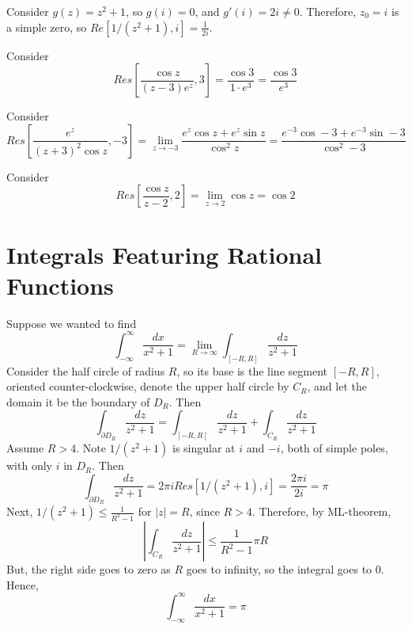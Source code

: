 \documentclass[12pt, a4paper, oneside, openright, titlepage]{book}
\begin{document}
\begin{eg}
    Consider $g(z) = z^2+1$, so $g(i) = 0$, and $g'(i) = 2i \neq 0$. Therefore, $z_0 = i$ is a simple zero, so $Re[1/(z^2+1),i] = \frac{1}{2i}$.
\end{eg}

\begin{eg}
    Consider \begin{equation*}
        Res\left[\frac{\cos z}{(z-3)e^z},3\right] = \frac{\cos 3}{1\cdot e^3} = \frac{\cos 3}{e^3}
    \end{equation*}
\end{eg}


\begin{eg}
    Consider \begin{equation*}
        Res\left[\frac{e^z}{(z+3)^2\cos z},-3\right] = \lim\limits_{z\rightarrow -3}\frac{e^z\cos z+e^z\sin z}{\cos^2z} = \frac{e^{-3}\cos -3 + e^{-3}\sin -3}{\cos^2-3}
    \end{equation*}
\end{eg}

\begin{eg}
    Consider \begin{equation*}
        Res\left[\frac{\cos z}{z-2},2\right] = \lim\limits_{z\rightarrow 2}\cos z = \cos 2
    \end{equation*}
\end{eg}


\section{Integrals Featuring Rational Functions}


\begin{cust}[Problem]
    Suppose we wanted to find $$\int_{-\infty}^{\infty}\frac{dx}{x^2+1} = \lim\limits_{R\rightarrow \infty}\int_{[-R,R]}\frac{dz}{z^2+1}$$ Consider the half circle of radius $R$, so its base is the line segment $[-R,R]$, oriented counter-clockwise, denote the upper half circle by $C_R$, and let the domain it be the boundary of $D_R$. Then \begin{equation*}
        \int_{\partial D_R}\frac{dz}{z^2+1} = \int_{[-R,R]}\frac{dz}{z^2+1}+\int_{C_R}\frac{dz}{z^2+1}
    \end{equation*}
    Assume $R > 4$. Note $1/(z^2+1)$ is singular at $i$ and $-i$, both of simple poles, with only $i$ in $D_R$. Then \begin{equation*}
        \int_{\partial D_R}\frac{dz}{z^2+1} = 2\pi iRes[1/(z^2+1),i] = \frac{2\pi i}{2i} = \pi
    \end{equation*}
    Next, $1/(z^2+1) \leq \frac{1}{R^2-1}$ for $|z| = R$, since $R > 4$. Therefore, by ML-theorem, \begin{equation*}
        \left|\int_{C_R}\frac{dz}{z^2+1}\right| \leq \frac{1}{R^2-1}\pi R
    \end{equation*}
    But, the right side goes to zero as $R$ goes to infinity, so the integral goes to $0$. Hence, \begin{equation*}
        \int_{-\infty}^{\infty}\frac{dx}{x^2+1} = \pi
    \end{equation*}
\end{cust}
\end{document}
